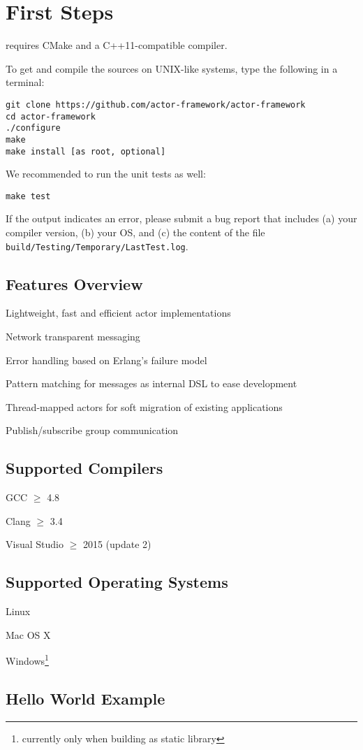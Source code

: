 \section{First Steps}

\lib requires CMake and a C++11-compatible compiler.

To get and compile the sources on UNIX-like systems, type the following in a terminal:

\begin{verbatim}
git clone https://github.com/actor-framework/actor-framework
cd actor-framework
./configure
make
make install [as root, optional]
\end{verbatim}

We recommended to run the unit tests as well:

\begin{verbatim}
make test
\end{verbatim}

If the output indicates an error, please submit a bug report that includes (a) your compiler version, (b) your OS, and (c) the content of the file \texttt{build/Testing/Temporary/LastTest.log}.

\subsection{Features Overview}

\begin{itemize*}
  \item Lightweight, fast and efficient actor implementations
  \item Network transparent messaging
  \item Error handling based on Erlang's failure model
  \item Pattern matching for messages as internal DSL to ease development
  \item Thread-mapped actors for soft migration of existing applications
  \item Publish/subscribe group communication
\end{itemize*}


\subsection{Supported Compilers}

\begin{itemize*}
  \item GCC $\ge$ 4.8
  \item Clang $\ge$ 3.4
  \item Visual Studio $\ge$ 2015 (update 2)
\end{itemize*}

\subsection{Supported Operating Systems}

\begin{itemize*}
\item Linux
\item Mac OS X
\item Windows\footnote{currently only when building \lib as static library}
\end{itemize*}

\clearpage
\subsection{Hello World Example}


